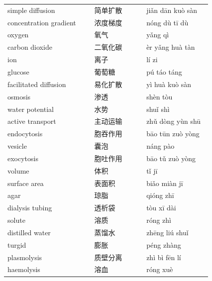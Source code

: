 \documentclass[11pt]{article}
\begin{document}
\begin{longtable}{@{}p{0.40\linewidth}p{0.24\linewidth}p{0.30\linewidth}@{}}
simple diffusion & 简单扩散 & jiǎn dān kuò sàn \\
concentration gradient & 浓度梯度 & nóng dù tī dù \\
oxygen & 氧气 & yǎng qì \\
carbon dioxide & 二氧化碳 & èr yǎng huà tàn \\
ion & 离子 & lí zi \\
glucose & 葡萄糖 & pú táo táng \\
facilitated diffusion & 易化扩散 & yì huà kuò sàn \\
osmosis & 渗透 & shèn tòu \\
water potential & 水势 & shuǐ shì \\
active transport & 主动运输 & zhǔ dòng yùn shū \\
endocytosis & 胞吞作用 & bāo tūn zuò yòng \\
vesicle & 囊泡 & náng pào \\
exocytosis & 胞吐作用 & bāo tǔ zuò yòng \\
volume & 体积 & tǐ jī \\
surface area & 表面积 & biǎo miàn jī \\
agar & 琼脂 & qióng zhī \\
dialysis tubing & 透析袋 & tòu xī dài \\
solute & 溶质 & róng zhì \\
distilled water & 蒸馏水 & zhēng liú shuǐ \\
turgid & 膨胀 & péng zhàng \\
plasmolysis & 质壁分离 & zhì bì fēn lí \\
haemolysis & 溶血 & róng xuè \\
\end{longtable}
\end{document}
